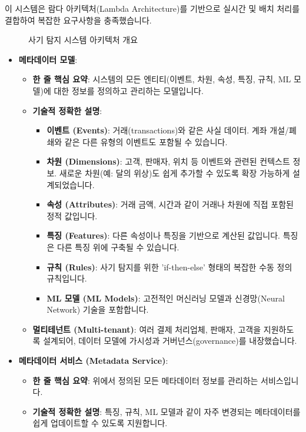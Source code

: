 \documentclass[11pt,a4paper]{article}
\theoremstyle{definition}
\begin{document}
\begin{itemize}
\begin{itemize}
\begin{itemize}
\begin{itemize}
이 시스템은 람다 아키텍처(Lambda Architecture)를 기반으로 실시간 및 배치 처리를 결합하여 복잡한 요구사항을 충족했습니다.

\begin{figure}[h!]
    \centering
    \caption{사기 탐지 시스템 아키텍처 개요}
    \label{fig:fraud_architecture}
\end{figure}

\begin{itemize}
    \item \textbf{메타데이터 모델}:
    \begin{itemize}
        \item \textbf{한 줄 핵심 요약}: 시스템의 모든 엔티티(이벤트, 차원, 속성, 특징, 규칙, ML 모델)에 대한 정보를 정의하고 관리하는 모델입니다.
        \item \textbf{기술적 정확한 설명}:
        \begin{itemize}
            \item \textbf{이벤트 (Events)}: 거래(transactions)와 같은 사실 데이터. 계좌 개설/폐쇄와 같은 다른 유형의 이벤트도 포함될 수 있습니다.
            \item \textbf{차원 (Dimensions)}: 고객, 판매자, 위치 등 이벤트와 관련된 컨텍스트 정보. 새로운 차원(예: 달의 위상)도 쉽게 추가할 수 있도록 확장 가능하게 설계되었습니다.
            \item \textbf{속성 (Attributes)}: 거래 금액, 시간과 같이 거래나 차원에 직접 포함된 정적 값입니다.
            \item \textbf{특징 (Features)}: 다른 속성이나 특징을 기반으로 계산된 값입니다. 특징은 다른 특징 위에 구축될 수 있습니다.
            \item \textbf{규칙 (Rules)}: 사기 탐지를 위한 'if-then-else' 형태의 복잡한 수동 정의 규칙입니다.
            \item \textbf{ML 모델 (ML Models)}: 고전적인 머신러닝 모델과 신경망(Neural Network) 기술을 포함합니다.
        \end{itemize}
        \item \textbf{멀티테넌트 (Multi-tenant)}: 여러 결제 처리업체, 판매자, 고객을 지원하도록 설계되어, 데이터 모델에 가시성과 거버넌스(governance)를 내장했습니다.
    \end{itemize}

    \item \textbf{메타데이터 서비스 (Metadata Service)}:
    \begin{itemize}
        \item \textbf{한 줄 핵심 요약}: 위에서 정의된 모든 메타데이터 정보를 관리하는 서비스입니다.
        \item \textbf{기술적 정확한 설명}: 특징, 규칙, ML 모델과 같이 자주 변경되는 메타데이터를 쉽게 업데이트할 수 있도록 지원합니다.
    \end{itemize}


\end{itemize}
\end{itemize}
\end{itemize}
\end{itemize}
\end{itemize}
\end{document}
